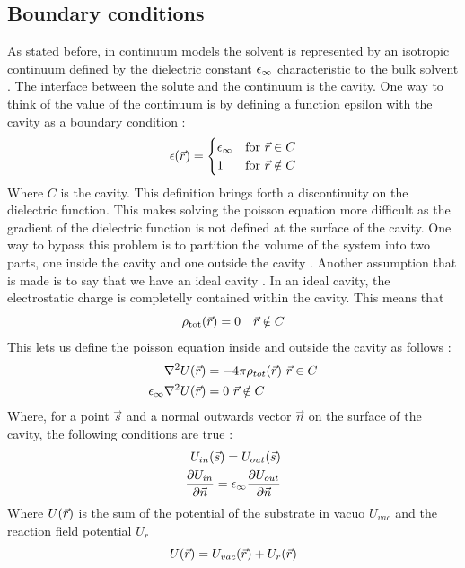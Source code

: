 \documentclass[../master_thesis.tex]{subfiles}
\begin{document}
\subsection{Boundary conditions}
As stated before, in continuum models the solvent is represented by an isotropic
continuum defined by the dielectric constant $\epsilon_{\infty}$ characteristic to the bulk
solvent \cite{Tomasi:1994wt}. The interface between the solute and the continuum
is the cavity. One way to think of the value of the continuum is by defining a
function epsilon with the cavity as a boundary condition \cite{Tomasi:2005ipa, Tomasi:1994wt}:
\begin{equation}
  \epsilon(\vec{r}) =
  \begin{cases}
  \epsilon_{\infty} & \text{for} \ \vec{r}\in C\\
  1 & \text{for}\ \vec{r} \notin C
\end{cases}
\end{equation}
Where $C$ is the cavity. This definition brings forth a discontinuity on the
dielectric function. This makes solving the poisson equation more difficult as
the gradient of the dielectric function is not defined at the surface of the
cavity. One way to bypass this problem is to partition the volume of the system
into two parts, one inside the cavity and one outside the cavity \cite{Tomasi:1994wt}.
Another assumption that is made is to say that we have an ideal cavity
\cite{Cramer:2004, Tomasi:1994wt}. In an ideal cavity, the electrostatic charge
is completelly contained within the cavity. This means that \cite{Tomasi:1994wt}
\begin{equation}
  \rho_{\mathrm{tot}}(\vec{r})=0 \quad \vec{r} \notin C
\end{equation}
This lets us define the poisson equation inside and outside the cavity as follows
\cite{Sorland, Tomasi:1994wt}:
\begin{align}
  \begin{split}
    \nabla^2U(\vec{r}) &= -4\pi\rho_{tot}(\vec{r})\ \vec{r}\in C\\
    \epsilon_{\infty}\nabla^2U(\vec{r}) &= 0 \ \vec{r} \notin C
  \end{split}
\end{align}
Where, for a point $\vec{s}$ and a normal outwards vector $\vec{n}$ on the
surface of the cavity, the following conditions are true
\cite{Sorland, Tomasi:1994wt}:
\begin{align}
  \begin{split}
    U_{in}(\vec{s}) = U_{out}(\vec{s})\\
    \frac{\partial U_{in}}{\partial\vec{n}} = \epsilon_{\infty}\frac{\partial U_{out}}{\partial\vec{n}}
  \end{split}
\end{align}
Where $U(\vec{r})$ is the sum of the potential of the substrate in vacuo
$U_{vac}$ and the reaction field potential $U_r$\cite{Sorland, FossoTande:2013ka}
\begin{equation}\label{eq:Utot}
  U(\vec{r}) = U_{vac}(\vec{r}) + U_r(\vec{r})
\end{equation}
\end{document}
